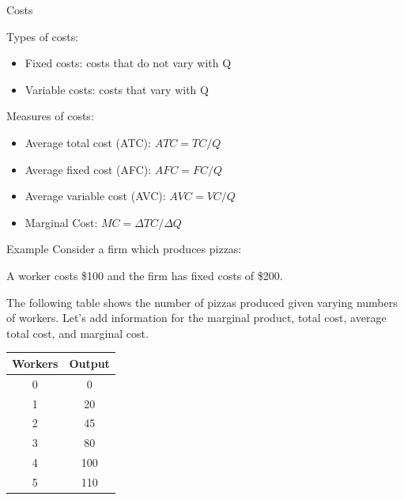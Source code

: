 \documentclass[compress]{beamer}
\begin{document}
\begin{frame}{Costs}
\begin{block}{Types of costs:}
    \begin{itemize}
    \item Fixed costs: costs that do not vary with Q
    \item Variable costs: costs that vary with Q
\end{itemize}
\end{block}

\begin{block}{Measures of costs:}
\begin{itemize}
    \item Average total cost (ATC): \(ATC = TC/Q\)
    \item Average fixed cost (AFC): \(AFC = FC/Q\)
    \item Average variable cost (AVC): \(AVC = VC/Q\)
    \item Marginal Cost: \(MC = \Delta TC/\Delta Q\)
\end{itemize}
\end{block}
\end{frame}

\begin{frame}{Example}
    Consider a firm which produces pizzas:
    
    \vspace{3mm}
    
     A worker costs \$100 and the firm has fixed costs of \$200. 
     
     \vspace{3mm}
     
         The following table shows the number of pizzas produced given varying numbers of workers. Let's add information for the marginal product, total cost, average total cost, and marginal cost.
    \begin{table}[H]
        \centering
        \begin{tabular}{cc}
            Workers & Output \\
            \hline
            0 & 0 \\
            1 & 20 \\
            2 & 45 \\
            3 & 80 \\
            4 & 100 \\
            5 & 110 \\
        \end{tabular}

        \label{tab:placeholder}
    \end{table}
\end{frame}
\end{document}
